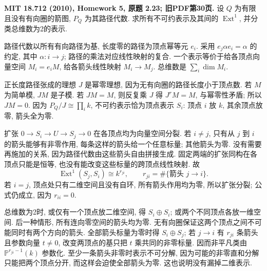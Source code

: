 \begin{exercise}\label{hw:2.23}
\textbf{MIT 18.712 (2010), Homework 5, 原题 2.23; 旧PDF第30页.}
设 $Q$ 为有限且没有有向圈的箭图, $P_Q$ 为其路径代数. 求所有不可约表示及其间的 $\operatorname{Ext}^1$, 并分类总维数为2的表示.
\end{exercise}
\begin{solution}
路径代数以所有有向路径为基, 长度零的路径为顶点幂等元 $e_i$. 采用 $e_j\alpha e_i=\alpha$ 的约定, 其中 $\alpha:i\to j$; 路径的乘法对应线性映射的复合. 一个表示等价于给各顶点向量空间 $M_i=e_iM$, 给各箭头线性映射 $M_i\to M_j$. 总维数是 $\sum_i\dim M_i$.

正长度路径张成的理想 $J$ 是幂零理想, 因为无有向圈的路径长度小于顶点数. 若 $M$ 为简单模, $JM$ 是子模. 若 $JM=M$, 则反复乘 $J$ 得 $J^rM=M$, 与幂零性矛盾; 所以 $JM=0$. 因为 $P_Q/J\cong\prod_i k$, 不可约表示恰为顶点表示 $S_i$: 顶点 $i$ 放 $k$, 其余顶点放零, 箭头全为零.

扩张 $0\to S_i\to U\to S_j\to0$ 在各顶点均为向量空间分裂. 若 $i\ne j$, 只有从 $j$ 到 $i$ 的箭头能够有非零作用, 每条这样的箭头给一个任意标量; 其他箭头为零. 没有需要再施加的关系, 因为路径代数由这些箭头自由拼接生成. 固定两端的扩张同构在各顶点只能是恒等, 也没有能改变这些标量的跨顶点线性映射. 故
\[
 \operatorname{Ext}^1(S_j,S_i)\cong k^{r_{ji}},
 \qquad r_{ji}=\#\{\text{箭头 }j\to i\}.
\]
若 $i=j$, 顶点处只有二维空间且没有自环, 所有箭头作用均为零, 所以扩张分裂; 公式仍成立, 因为 $r_{ii}=0$.

总维数为2时, 或仅有一个顶点放二维空间, 得 $S_i\oplus S_i$; 或两个不同顶点各放一维空间. 后一种情形, 所有连向零空间的箭头均为零. 无有向圈保证这两个顶点之间不可能同时有两个方向的箭头. 全部箭头标量为零时得 $S_i\oplus S_j$; 若 $j\to i$ 有 $r_{ji}$ 条箭头且参数向量 $t\ne0$, 改变两顶点的基只把 $t$ 乘共同的非零标量. 因而非平凡类由 $\mathbb P^{r_{ji}-1}(k)$ 参数化. 至少一条箭头非零时表示不可分解, 因为可能的非零直和分解只能把两个顶点分开, 而这样会迫使全部箭头为零. 这也说明没有漏掉二维表示.
\end{solution}

